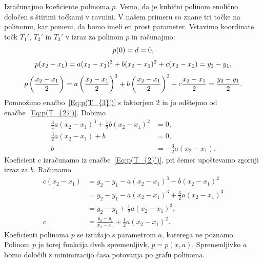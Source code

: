 \documentclass[a4paper]{article}
\begin{document}
Izračunajmo koeficiente polinoma $p$. Vemo, da je kubični polinom enolično določen s štirimi točkami v ravnini. V našem primeru so znane tri točke na polinomu, kar pomeni, da bomo imeli en prost parameter. Vstavimo koordinate točk $T_{1}'$, $T_{2}'$ in $T_{3}'$ v izraz za polinom $p$ in računajmo:
\begin{equation}
\label{Eq:p(T_{1}')}
p(0) = d = 0,
\end{equation}
%
\begin{equation}
\label{Eq:p(T_{2}')}
p(x_2-x_1) = a(x_2-x_1)^3+b(x_2-x_1)^2+c(x_2-x_1) = y_2-y_1,
\end{equation}
%
\begin{equation}
\label{Eq:p(T_{3}')}
p \left(\frac{x_2-x_1}{2} \right) = a \left(\frac{x_2-x_1}{2} \right)^3+b \left(\frac{x_2-x_1}{2} \right)^2+c \frac{x_2-x_1}{2} = \frac{y_2-y_1}{2}.
\end{equation}
%
Pomnožimo enačbo~\eqref{Eq:p(T_{3}')} s faktorjem $2$ in jo odštejmo od enačbe~\eqref{Eq:p(T_{2}')}. Dobimo
\begin{align}
\frac{3}{4} a(x_2-x_1)^3 + \frac{1}{2} b(x_2-x_1)^2 &= 0, \nonumber \\
\frac{3}{2} a(x_2-x_1) + b &= 0, \nonumber \\
b &= -\frac{3}{2} a(x_2-x_1).
\end{align}
%
Koeficient $c$ izračunamo iz enačbe~\eqref{Eq:p(T_{2}')}, pri čemer upoštevamo zgornji izraz za $b$. Računamo
\begin{align}
c(x_2-x_1) &= y_2 - y_1 - a(x_2-x_1)^3 - b(x_2-x_1)^2 \nonumber \\
 &= y_2 - y_1 - a(x_2-x_1)^3 + \frac{3}{2} a(x_2-x_1)^3 \nonumber \\
 &= y_2 - y_1 + \frac{1}{2} a(x_2-x_1)^3, \nonumber \\
c &= \frac{y_2-y_1}{x_2-x_1} + \frac{1}{2} a(x_2-x_1)^2.
\end{align}
%
Koeficienti polinoma $p$ se izražajo s parametrom $a$, katerega ne poznamo. Polinom $p$ je torej funkcija dveh spremenljivk, $p = p(x,a)$. Spremenljivko $a$ bomo določili z minimizacijo časa potovanja po grafu polinoma.
\end{document}
